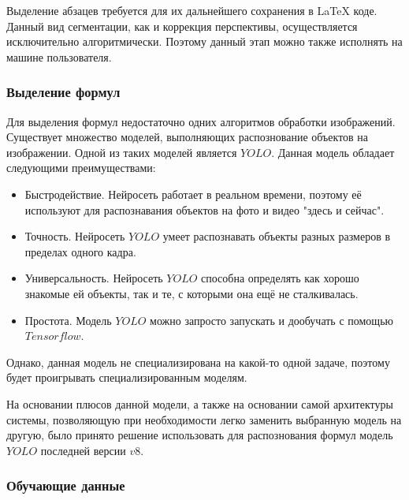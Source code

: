 Выделение абзацев требуется для их дальнейшего сохранения в \LaTeX\; коде. Данный вид сегментации, как и коррекция перспективы, осуществляется исключительно алгоритмически.
Поэтому данный этап можно также исполнять на машине пользователя.


\subsubsection{Выделение формул}

Для выделения формул недостаточно одних алгоритмов обработки изображений. Существует множество моделей, выполняющих распознование объектов на изображении.
Одной из таких моделей является $YOLO$. Данная модель обладает следующими преимуществами:
\begin{itemize}
    \item Быстродействие. Нейросеть работает в реальном времени, поэтому её используют для распознавания объектов на фото и видео "здесь и сейчас".
    \item Точность. Нейросеть $YOLO$ умеет распознавать объекты разных размеров в пределах одного кадра.
    \item Универсальность. Нейросеть $YOLO$ способна определять как хорошо знакомые ей объекты, так и те, с которыми она ещё не сталкивалась.
    \item Простота. Модель $YOLO$ можно запросто запускать и дообучать с помощью $Tensorflow$.
\end{itemize}

Однако, данная модель не специализирована на какой-то одной задаче, поэтому будет проигрывать специализированным моделям.

На основании плюсов данной модели, а также на основании самой архитектуры системы, позволяющую при необходимости легко заменить выбранную модель на другую, было принято решение использовать для распознования формул модель $YOLO$ последней версии $v8$.

\subsubsection{Обучающие данные}

